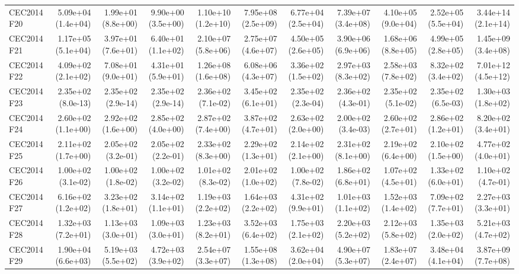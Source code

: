 \begin{longtable}{lrrrrrrrrrr}
CEC2014 F20 & 5.09e+04 (1.4e+04) & 1.99e+01 (8.8e+00) & 9.90e+00 (3.5e+00) & 1.10e+10 (1.2e+10) & 7.95e+08 (2.5e+09) & 6.77e+04 (2.5e+04) & 7.39e+07 (3.4e+08) & 4.10e+05 (9.0e+04) & 2.52e+05 (5.5e+04) & 3.44e+14 (2.1e+14) \\
CEC2014 F21 & 1.17e+05 (5.1e+04) & 3.97e+01 (7.6e+01) & 6.40e+01 (1.1e+02) & 2.10e+07 (5.8e+06) & 2.75e+07 (4.6e+07) & 4.50e+05 (2.6e+05) & 3.90e+06 (6.9e+06) & 1.68e+06 (8.8e+05) & 4.99e+05 (2.8e+05) & 1.45e+09 (3.4e+08) \\
CEC2014 F22 & 4.09e+02 (2.1e+02) & 7.08e+01 (9.0e+01) & 4.31e+01 (5.9e+01) & 1.26e+08 (1.6e+08) & 6.08e+06 (4.3e+07) & 3.36e+02 (1.5e+02) & 2.97e+03 (8.3e+02) & 2.58e+03 (7.8e+02) & 8.32e+02 (3.4e+02) & 7.01e+12 (4.5e+12) \\
CEC2014 F23 & 2.35e+02 (8.0e-13) & 2.35e+02 (2.9e-14) & 2.35e+02 (2.9e-14) & 2.36e+02 (7.1e-02) & 3.45e+02 (6.1e+01) & 2.35e+02 (2.3e-04) & 2.36e+02 (4.3e-01) & 2.35e+02 (5.1e-02) & 2.35e+02 (6.5e-03) & 1.30e+03 (1.8e+02) \\
CEC2014 F24 & 2.60e+02 (1.1e+00) & 2.92e+02 (1.6e+00) & 2.85e+02 (4.0e+00) & 2.87e+02 (7.4e+00) & 3.87e+02 (4.7e+01) & 2.63e+02 (2.0e+00) & 2.00e+02 (3.4e-03) & 2.60e+02 (2.7e+01) & 2.86e+02 (1.2e+01) & 8.20e+02 (3.4e+01) \\
CEC2014 F25 & 2.11e+02 (1.7e+00) & 2.05e+02 (3.2e-01) & 2.05e+02 (2.2e-01) & 2.33e+02 (8.3e+00) & 2.29e+02 (1.3e+01) & 2.14e+02 (2.1e+00) & 2.31e+02 (8.1e+00) & 2.19e+02 (6.4e+00) & 2.10e+02 (1.5e+00) & 4.77e+02 (4.0e+01) \\
CEC2014 F26 & 1.00e+02 (3.1e-02) & 1.00e+02 (1.8e-02) & 1.00e+02 (3.2e-02) & 1.01e+02 (8.3e-02) & 2.01e+02 (1.0e+02) & 1.00e+02 (7.8e-02) & 1.86e+02 (6.8e+01) & 1.07e+02 (4.5e+01) & 1.33e+02 (6.0e+01) & 1.10e+02 (4.7e-01) \\
CEC2014 F27 & 6.16e+02 (1.2e+02) & 3.23e+02 (1.8e+01) & 3.14e+02 (1.1e+01) & 1.19e+03 (2.2e+02) & 1.64e+03 (2.2e+02) & 4.31e+02 (9.9e+01) & 1.01e+03 (1.1e+02) & 1.52e+03 (1.4e+02) & 7.09e+02 (7.7e+01) & 2.27e+03 (3.3e+01) \\
CEC2014 F28 & 1.32e+03 (7.2e+01) & 1.13e+03 (3.0e+01) & 1.09e+03 (3.0e+01) & 1.23e+03 (8.2e+01) & 3.52e+03 (6.4e+02) & 1.75e+03 (2.1e+02) & 2.20e+03 (5.2e+02) & 2.12e+03 (5.8e+02) & 1.35e+03 (2.0e+02) & 5.21e+03 (4.7e+02) \\
CEC2014 F29 & 1.90e+04 (6.6e+03) & 5.19e+03 (5.5e+02) & 4.72e+03 (3.9e+02) & 2.54e+07 (3.3e+07) & 1.55e+08 (1.3e+08) & 3.62e+04 (2.0e+04) & 4.90e+07 (5.3e+07) & 1.83e+07 (2.4e+07) & 3.48e+04 (4.1e+04) & 3.87e+09 (7.7e+08) \\

\end{longtable}
